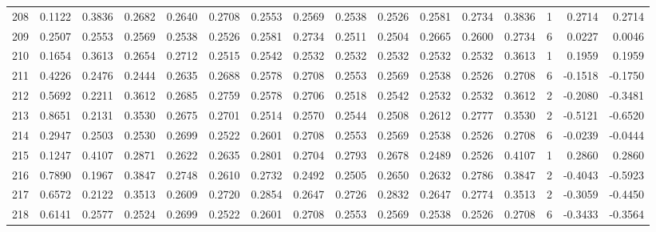 \begin{tabular}{lrrrrrrrrrrrrrrr}
208 &      0.1122 &  0.3836 &  0.2682 &  0.2640 &  0.2708 &  0.2553 &  0.2569 &  0.2538 &  0.2526 &  0.2581 &   0.2734 &     0.3836 &      1 &                    0.2714 &                     0.2714 \\
209 &      0.2507 &  0.2553 &  0.2569 &  0.2538 &  0.2526 &  0.2581 &  0.2734 &  0.2511 &  0.2504 &  0.2665 &   0.2600 &     0.2734 &      6 &                    0.0227 &                     0.0046 \\
210 &      0.1654 &  0.3613 &  0.2654 &  0.2712 &  0.2515 &  0.2542 &  0.2532 &  0.2532 &  0.2532 &  0.2532 &   0.2532 &     0.3613 &      1 &                    0.1959 &                     0.1959 \\
211 &      0.4226 &  0.2476 &  0.2444 &  0.2635 &  0.2688 &  0.2578 &  0.2708 &  0.2553 &  0.2569 &  0.2538 &   0.2526 &     0.2708 &      6 &                   -0.1518 &                    -0.1750 \\
212 &      0.5692 &  0.2211 &  0.3612 &  0.2685 &  0.2759 &  0.2578 &  0.2706 &  0.2518 &  0.2542 &  0.2532 &   0.2532 &     0.3612 &      2 &                   -0.2080 &                    -0.3481 \\
213 &      0.8651 &  0.2131 &  0.3530 &  0.2675 &  0.2701 &  0.2514 &  0.2570 &  0.2544 &  0.2508 &  0.2612 &   0.2777 &     0.3530 &      2 &                   -0.5121 &                    -0.6520 \\
214 &      0.2947 &  0.2503 &  0.2530 &  0.2699 &  0.2522 &  0.2601 &  0.2708 &  0.2553 &  0.2569 &  0.2538 &   0.2526 &     0.2708 &      6 &                   -0.0239 &                    -0.0444 \\
215 &      0.1247 &  0.4107 &  0.2871 &  0.2622 &  0.2635 &  0.2801 &  0.2704 &  0.2793 &  0.2678 &  0.2489 &   0.2526 &     0.4107 &      1 &                    0.2860 &                     0.2860 \\
216 &      0.7890 &  0.1967 &  0.3847 &  0.2748 &  0.2610 &  0.2732 &  0.2492 &  0.2505 &  0.2650 &  0.2632 &   0.2786 &     0.3847 &      2 &                   -0.4043 &                    -0.5923 \\
217 &      0.6572 &  0.2122 &  0.3513 &  0.2609 &  0.2720 &  0.2854 &  0.2647 &  0.2726 &  0.2832 &  0.2647 &   0.2774 &     0.3513 &      2 &                   -0.3059 &                    -0.4450 \\
218 &      0.6141 &  0.2577 &  0.2524 &  0.2699 &  0.2522 &  0.2601 &  0.2708 &  0.2553 &  0.2569 &  0.2538 &   0.2526 &     0.2708 &      6 &                   -0.3433 &                    -0.3564 \\

\end{tabular}
